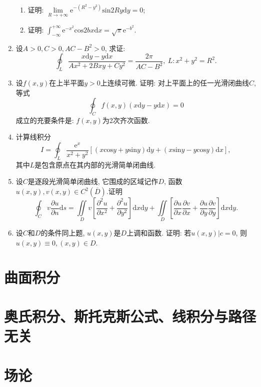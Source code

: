 \begin{enumerate}
\begin{enumerate}
		\item 证明: $\displaystyle{\lim\limits_{R\rightarrow +\infty}\mathrm{e}^{-(R^2-y^2)}\mathrm{sin}2Ry\mathrm{d}y=0}$;
		\item 证明: $\displaystyle{\int_{-\infty}^{+\infty}\mathrm{e}^{-x^2}\mathrm{cos}2bx\mathrm{d}x=\sqrt{\pi}\mathrm{e}^{-b^2}}$.
\end{enumerate}
\item 设$A>0, C>0, AC-B^2>0$, 求证:
$$ \displaystyle{\oint_{L}\frac{x\mathrm{d}y-y\mathrm{d}x}{Ax^2+2Bxy+Cy^2}=\frac{2\pi}{AC-B^2}},\  L: x^2 + y^2 = R^2.$$
\item 设$f(x,y)$在上半平面$y>0$上连续可微. 证明: 对上平面上的任一光滑闭曲线$C$, 等式
$$ \displaystyle{\oint_{C}f(x,y)(x\mathrm{d}y-y\mathrm{d}x)=0}$$
成立的充要条件是: $f(x,y)$为2次齐次函数.
\item 计算线积分
	$$ I = \displaystyle{\oint_{L}\frac{\mathrm{e}^x}{x^2+y^2}[(x\mathrm{cos}y+y\mathrm{sin}y)\mathrm{d}y+(x\mathrm{sin}y-y\mathrm{cos}y)\mathrm{d}x]},$$
	其中$L$是包含原点在其内部的光滑简单闭曲线.
	\item 设$C$是逐段光滑简单闭曲线, 它围成的区域记作$D$, 函数$u(x,y),v(x,y)\in C^2(\overline{D})$.证明$$
	\displaystyle{\oint_{C}v\frac{\partial u}{\partial n}\mathrm{d}s=\iint\limits_{D}v[\frac{\partial^2 u}{\partial x^2}+\frac{\partial^2u}{\partial y^2}]\mathrm{d}x\mathrm{d}y+\iint\limits_{D}[\frac{\partial u}{\partial x}\frac{\partial v}{\partial x}+\frac{\partial u}{\partial y}\frac{\partial v}{\partial y}]\mathrm{d}x\mathrm{d}y}.$$
	\item 设$C$和$D$的条件同上题, $u(x,y)$是$D$上调和函数. 证明: 若$u(x,y)|c=0$, 则$u(x,y)\equiv 0,(x,y)\in D$. 
\end{enumerate}
\section{曲面积分}

\section{奥氏积分、斯托克斯公式、线积分与路径无关}

\section{场论}